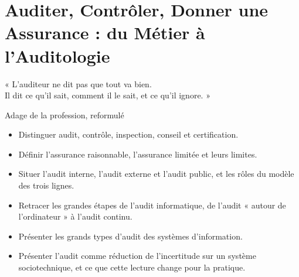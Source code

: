 
\chapter[Auditer, Contrôler, Donner une Assurance]{Auditer, Contrôler, Donner une Assurance : du Métier à l'Auditologie}
\label{chap:audit-auditologie}

\epigraph{%
    « L'auditeur ne dit pas que tout va bien.\\
    Il dit ce qu'il sait, comment il le sait, et ce qu'il ignore. »%
}{Adage de la profession, reformulé}


\begin{boxobjectifs}
\begin{itemize}
    \item Distinguer audit, contrôle, inspection, conseil et certification.
    \item Définir l'assurance raisonnable, l'assurance limitée et leurs
          limites.
    \item Situer l'audit interne, l'audit externe et l'audit public, et les
          rôles du modèle des trois lignes.
    \item Retracer les grandes étapes de l'audit informatique, de l'audit
          « autour de l'ordinateur » à l'audit continu.
    \item Présenter les grands types d'audit des systèmes d'information.
    \item Présenter l'audit comme réduction de l'incertitude sur un système
          sociotechnique, et ce que cette lecture change pour la pratique.
\end{itemize}
\end{boxobjectifs}

